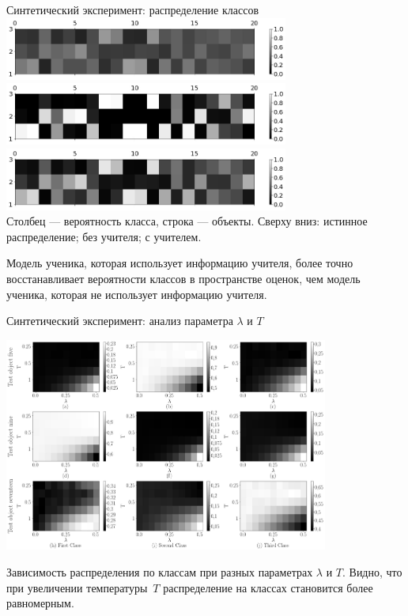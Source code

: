 \documentclass[10pt,pdf,hyperref={unicode}]{beamer}
\begin{document}
\begin{frame}{Синтетический эксперимент: распределение классов}
\justifying
{\center
\includegraphics[width=0.7\textwidth]{figures/syn_real_distr}\\
\includegraphics[width=0.7\textwidth]{figures/syn_without_teacher_distr}\\
\includegraphics[width=0.7\textwidth]{figures/syn_with_teacher_distr}\\
}
Столбец --- вероятность класса, строка --- объекты.
Сверху вниз: истинное распределение; без учителя; с учителем.

Модель ученика, которая использует информацию учителя, более точно восстанавливает вероятности классов в пространстве оценок, чем модель ученика, которая не использует информацию учителя.
\end{frame}

\begin{frame}{Синтетический эксперимент: анализ параметра $\lambda$ и $T$}
\justifying
\begin{center}
{\center
\includegraphics[width=0.8\textwidth]{figures/syn_T_lambda}
}
\end{center}

Зависимость распределения по классам при разных параметрах $\lambda$ и $T$.  Видно, что при увеличении температуры~$T$ распределение на классах становится более равномерным.

\end{frame}
\end{document}
